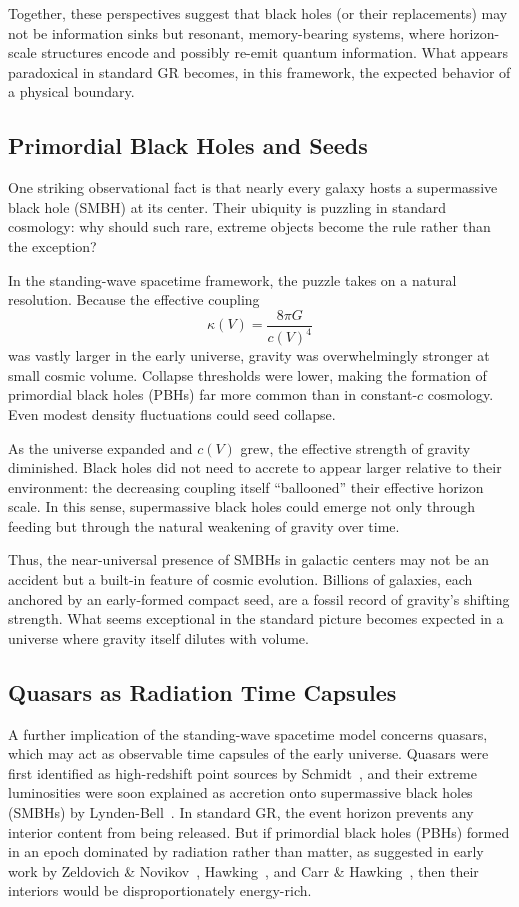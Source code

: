 \documentclass[12pt]{article}
\begin{document}
Together, these perspectives suggest that black holes (or their replacements) may not be information sinks but resonant, memory-bearing systems, where horizon-scale structures encode and possibly re-emit quantum information. What appears paradoxical in standard GR becomes, in this framework, the expected behavior of a physical boundary.

\subsection{Primordial Black Holes and Seeds}

One striking observational fact is that nearly every galaxy hosts a supermassive black hole (SMBH) at its center. Their ubiquity is puzzling in standard cosmology: why should such rare, extreme objects become the rule rather than the exception?

In the standing-wave spacetime framework, the puzzle takes on a natural resolution. Because the effective coupling 
\[
\kappa(V) = \frac{8\pi G}{c(V)^4}
\]
was vastly larger in the early universe, gravity was overwhelmingly stronger at small cosmic volume. Collapse thresholds were lower, making the formation of primordial black holes (PBHs) far more common than in constant-$c$ cosmology. Even modest density fluctuations could seed collapse.

As the universe expanded and $c(V)$ grew, the effective strength of gravity diminished. Black holes did not need to accrete to appear larger relative to their environment: the decreasing coupling itself ``ballooned'' their effective horizon scale. In this sense, supermassive black holes could emerge not only through feeding but through the natural weakening of gravity over time.

Thus, the near-universal presence of SMBHs in galactic centers may not be an accident but a built-in feature of cosmic evolution. Billions of galaxies, each anchored by an early-formed compact seed, are a fossil record of gravity’s shifting strength. What seems exceptional in the standard picture becomes expected in a universe where gravity itself dilutes with volume.

\subsection{Quasars as Radiation Time Capsules}

A further implication of the standing-wave spacetime model concerns quasars, which may act as observable time capsules of the early universe. Quasars were first identified as high-redshift point sources by Schmidt~\cite{schmidt1963quasar}, and their extreme luminosities were soon explained as accretion onto supermassive black holes (SMBHs) by Lynden-Bell~\cite{lyndenbell1969}. In standard GR, the event horizon prevents any interior content from being released. But if primordial black holes (PBHs) formed in an epoch dominated by radiation rather than matter, as suggested in early work by Zeldovich \& Novikov~\cite{zeldovich1967pbh}, Hawking~\cite{hawking1971pbh}, and Carr \& Hawking~\cite{carrhawking1974}, then their interiors would be disproportionately energy-rich.
\end{document}

